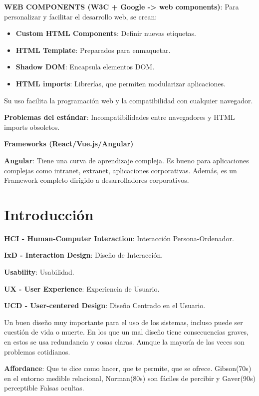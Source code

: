\documentclass[12pt, twoside, openright]{report} %
\begin{document}
\textbf{WEB COMPONENTS (W3C + Google -\textgreater{} web components)}: Para personalizar y facilitar el desarrollo web, se crean:

\begin{itemize}
\item
  \textbf{Custom HTML Components}: Definir nuevas etiquetas.
\item
  \textbf{HTML Template}: Preparados para enmaquetar.
\item
  \textbf{Shadow DOM}: Encapsula elementos DOM.
\item
  \textbf{HTML imports}: Librerías, que permiten modularizar
  aplicaciones.
\end{itemize}

Su uso facilita la programación web y la compatibilidad con cualquier
navegador.

\textbf{Problemas del estándar}: Incompatibilidades entre navegadores y
HTML imports obsoletos.

\textbf{Frameworks (React/Vue.js/Angular)}

\textbf{Angular}: Tiene una curva de aprendizaje compleja. Es bueno para aplicaciones complejas como intranet, extranet, aplicaciones corporativas. Además, es un Framework completo dirigido a desarrolladores corporativos.

\chapter{Introducción}

\textbf{HCI - Human-Computer Interaction}: Interacción
Persona-Ordenador.

\textbf{IxD - Interaction Design}: Diseño de Interacción.

\textbf{Usability}: Usabilidad.

\textbf{UX - User Experience}: Experiencia de Usuario.

\textbf{UCD - User-centered Design}: Diseño Centrado en el Usuario.

Un buen diseño muy importante para el uso de los sistemas, incluso puede ser cuestión de vida o muerte. En los que un mal diseño tiene consecuencias graves, en estos se usa redundancia y cosas claras. Aunque la mayoría de las veces son problemas cotidianos.

\textbf{Affordance}: Que te dice como hacer, que te permite, que se
ofrece. Gibson(70s) en el entorno medible relacional, Norman(80s) son
fáciles de percibir y Gaver(90s) perceptible Falsas ocultas.
\end{document}
